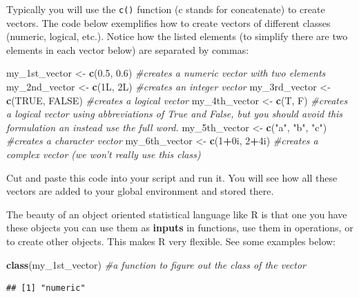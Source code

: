 \documentclass[]{book}
\newenvironment{Shaded}{\begin{snugshade}}{\end{snugshade}}
\newcommand{\CommentTok}[1]{\textcolor[rgb]{0.56,0.35,0.01}{\textit{#1}}}
\newcommand{\DecValTok}[1]{\textcolor[rgb]{0.00,0.00,0.81}{#1}}
\newcommand{\FloatTok}[1]{\textcolor[rgb]{0.00,0.00,0.81}{#1}}
\newcommand{\KeywordTok}[1]{\textcolor[rgb]{0.13,0.29,0.53}{\textbf{#1}}}
\newcommand{\NormalTok}[1]{#1}
\newcommand{\OperatorTok}[1]{\textcolor[rgb]{0.81,0.36,0.00}{\textbf{#1}}}
\newcommand{\OtherTok}[1]{\textcolor[rgb]{0.56,0.35,0.01}{#1}}
\newcommand{\StringTok}[1]{\textcolor[rgb]{0.31,0.60,0.02}{#1}}
\begin{document}
Typically you will use the \texttt{c()} function (c stands for concatenate) to create vectors. The code below exemplifies how to create vectors of different classes (numeric, logical, etc.). Notice how the listed elements (to simplify there are two elements in each vector below) are separated by commas:

\begin{Shaded}
\begin{Highlighting}[]
\NormalTok{my_1st_vector <-}\StringTok{ }\KeywordTok{c}\NormalTok{(}\FloatTok{0.5}\NormalTok{, }\FloatTok{0.6}\NormalTok{) }\CommentTok{#creates a numeric vector with two elements}
\NormalTok{my_2nd_vector <-}\StringTok{ }\KeywordTok{c}\NormalTok{(1L, 2L) }\CommentTok{#creates an integer vector}
\NormalTok{my_3rd_vector <-}\StringTok{ }\KeywordTok{c}\NormalTok{(}\OtherTok{TRUE}\NormalTok{, }\OtherTok{FALSE}\NormalTok{) }\CommentTok{#creates a logical vector}
\NormalTok{my_4th_vector <-}\StringTok{ }\KeywordTok{c}\NormalTok{(T, F) }\CommentTok{#creates a logical vector using abbreviations of True and False, but you should avoid this formulation an instead use the full word.}
\NormalTok{my_5th_vector <-}\StringTok{ }\KeywordTok{c}\NormalTok{(}\StringTok{"a"}\NormalTok{, }\StringTok{"b"}\NormalTok{, }\StringTok{"c"}\NormalTok{) }\CommentTok{#creates a character vector}
\NormalTok{my_6th_vector <-}\StringTok{ }\KeywordTok{c}\NormalTok{(}\DecValTok{1}\OperatorTok{+}\NormalTok{0i, }\DecValTok{2}\OperatorTok{+}\NormalTok{4i) }\CommentTok{#creates a complex vector (we won't really use this class)}
\end{Highlighting}
\end{Shaded}

Cut and paste this code into your script and run it. You will see how all these vectors are added to your global environment and stored there.

The beauty of an object oriented statistical language like R is that one you have these objects you can use them as \textbf{inputs} in functions, use them in operations, or to create other objects. This makes R very flexible. See some examples below:

\begin{Shaded}
\begin{Highlighting}[]
\KeywordTok{class}\NormalTok{(my_1st_vector) }\CommentTok{#a function to figure out the class of the vector}
\end{Highlighting}
\end{Shaded}

\begin{verbatim}
## [1] "numeric"
\end{verbatim}
\end{document}
